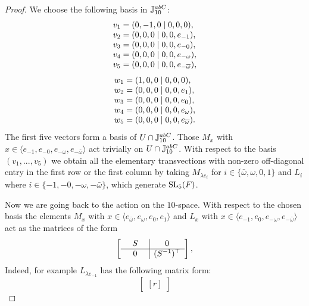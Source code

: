 \begin{proof}
We choose the following basis in $\mathbb{J}_{10}^{abC}$:
	\begin{equation*}
		\begin{array}{r@{\;}c@{\;}l}
			v_1 & = & (0,-1,0 \mid 0,0,0), \\
			v_2 & = & (0,0,0 \mid 0,0, e_{-1}), \\
			v_3 & = & (0,0,0 \mid 0,0, e_{-0}), \\
			v_4 & = & (0,0,0 \mid 0,0, e_{-\omega}), \\
			v_5 & = & (0,0,0 \mid 0,0, e_{-\bar{\omega}}),
		\end{array}
	\end{equation*}
	\begin{equation*}
		\begin{array}{r@{\;}c@{\;}l}
			w_1 & = & (1,0,0 \mid 0,0,0), \\
			w_2 & = & (0,0,0 \mid 0,0,e_1), \\
			w_3 & = & (0,0,0 \mid 0,0,e_0), \\
			w_4 & = & (0,0,0 \mid 0,0,e_{\omega}), \\
			w_5 & = & (0,0,0 \mid 0,0,e_{\bar{\omega}}). 
		\end{array}
	\end{equation*}
	The first five vectors form a basis of $U \cap \mathbb{J}_{10}^{abC}$. Those $M_x$ with $x \in \langle e_{-1}, e_{-0}, e_{-\omega}, e_{-\bar{\omega}}\rangle$ act trivially on $U \cap \mathbb{J}_{10}^{abC}$. With respect to the basis $(v_1, ..., v_5)$
we obtain all the elementary transvections with non-zero 
off-diagonal entry in the first row or the first column by
taking $M_{\lambda e_i}$ for 
$i \in \{\bar{\omega}, \omega, 0, 1\}$ and $L_i$ where
$i \in \{-1, -0, -\omega, -\bar{\omega}\}$, which generate
$\mathrm{SL}_5(F)$.	
	
Now we are going back to the action on the $10$-space. 
With respect to the chosen basis the elements 
	$M_x$ with $x \in \langle e_{\bar{\omega}}, e_{\omega}, e_0, e_1 \rangle$ and 
	$L_x$ with $x \in \langle e_{-1}, e_0, e_{-\omega}, e_{-\bar{\omega}} \rangle$ act as 
	the matrices of the form 
	\begin{equation*}
		\left[
			\begin{array}{@{\;\;\;\;\;}c@{\;\;\;\;\;}|c}
				S & 0 \\ \hline
				0 & (S^{-1})^{\T}
			\end{array}
		\right],
	\end{equation*}
	Indeed, for example $L_{\lambda e_{-1}}$ has the following matrix form:
	\begin{equation*}
	\begin{bmatrix}[r]
	

\end{bmatrix}
\end{equation*}
\end{proof}
